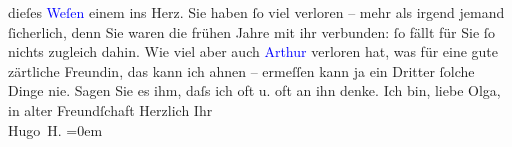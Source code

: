                dieſes \textcolor{blue}{Weſen}{} einem ins Herz. Sie
               haben ſo viel {\pb}verloren – mehr als irgend jemand
               ſicherlich, denn Sie waren die frühen Jahre mit ihr verbunden: ſo fällt für Sie ſo
               nichts zugleich dahin.\pend
           \pstart
           Wie viel aber auch \textcolor{blue}{Arthur}{}\ledrightnote{} verloren hat, was für
               eine gute zärtliche Freundin, das kann ich ahnen – ermeſſen kann ja ein Dritter
               ſolche Dinge nie. Sagen Sie es ihm, daſs ich oft u. oft an ihn denke.\pend
           \pstart
           {\pb}Ich bin, liebe Olga, in alter Freundſchaft\pend
           \pstart
           Herzlich Ihr{\\[\baselineskip]}\spacefill\mbox{Hugo H.}\pend
           \leftskip=0em{}\endnumbering{}  
      